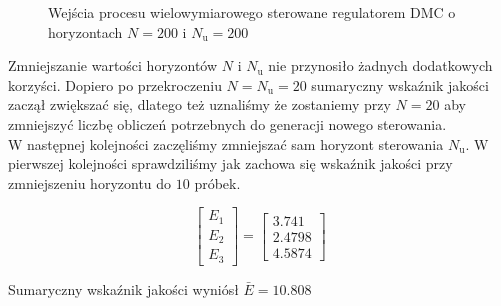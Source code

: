 \begin{figure}
    \begin{subfigure}[b]{\textwidth}
        \centering
    \end{subfigure}
    \caption{Wejścia procesu wielowymiarowego sterowane regulatorem DMC o horyzontach $N = \num{200}$ i
    $N_{\mathrm{u}} = \num{200}$}
    \label{pro_dmc_1_in}
\end{figure}
\FloatBarrier


Zmniejszanie wartości horyzontów $N$ i $N_{\mathrm{u}}$ nie przynosiło żadnych dodatkowych
korzyści. Dopiero po przekroczeniu $N = N_{\mathrm{u}} = \num{20}$ sumaryczny wskaźnik jakości
zaczął zwiększać się, dlatego też uznaliśmy że zostaniemy przy $N = \num{20}$ aby zmniejszyć liczbę
obliczeń potrzebnych do generacji nowego sterowania.\\

W następnej kolejności zaczęliśmy zmniejszać sam horyzont sterowania $N_{\mathrm{u}}$.
W pierwszej kolejności sprawdziliśmy jak zachowa się wskaźnik jakości przy zmniejszeniu
horyzontu do $\num{10}$ próbek.

\[
\begin{bmatrix}
    E_{\mathrm{1}} \\
    E_{\mathrm{2}} \\
    E_{\mathrm{3}} 
\end{bmatrix}
= 
\begin{bmatrix}
    \num{3.741} \\
    \num{2.4798} \\
    \num{4.5874}
\end{bmatrix}
\]

Sumaryczny wskaźnik jakości wyniósł $\bar{E} = \num{10.808}$\\

